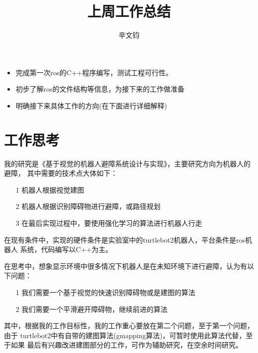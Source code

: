 \documentclass[a4paper]{article}
\title{上周工作总结}
\author{辛文钧}
\begin{document}
	\maketitle
	\begin{itemize}
		\item 完成第一次ros的C++程序编写，测试工程可行性。
		\item 初步了解ros的文件结构等信息，为接下来的工作做准备
		\item 明确接下来具体工作的方向(在下面进行详细解释)
	\end{itemize}
	\section{工作思考}
	我的研究是《基于视觉的机器人避障系统设计与实现》，主要研究方向为机器人的避障，
	其中需要的技术点大体如下：
	\begin{itemize}
		\item[1] 机器人根据视觉建图
		\item[2] 机器人根据识别障碍物进行避障，或路径规划
		\item[3] 在最后实现过程中，要使用强化学习的算法进行机器人行走
	\end{itemize}
	
	在现有条件中，实现的硬件条件是实验室中的turtlebot2机器人，平台条件是ros机器人
	系统，代码编写以C++为主。
	
	在思考中，想象显示环境中很多情况下机器人是在未知环境下进行避障，认为有以下问题：
	\begin{itemize}
		\item[1] 我们需要一个基于视觉的快速识别障碍物或是建图的算法
		\item[2] 我们需要一个平滑避开障碍物，继续前进的算法
	\end{itemize}
	
	其中，根据我的工作目标性，我的工作重心要放在第二个问题，至于第一个问题，由于
	turtlebot2中有自带的建图算法(gmapping算法)，可暂时使用此算法代替，至于如果
	最后有兴趣改进建图部分的工作，可作为辅助研究，在空余时间研究。
\end{document}
